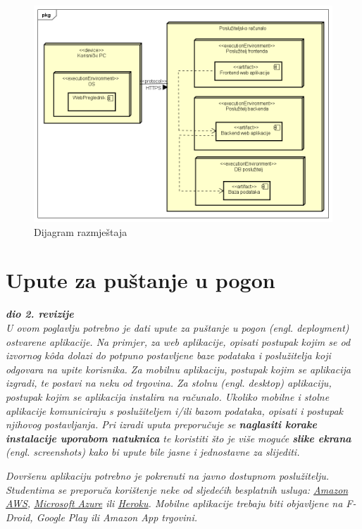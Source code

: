 			 \begin{figure}[H]
			 	\includegraphics[width=\textwidth]{dijagrami/Dijagram razmjestaja.PNG} %
			 	\caption{Dijagram razmještaja}
			 	\label{fig:dijagramrazmjestaja} %
			 \end{figure}
			
			\eject 
		
		\section{Upute za puštanje u pogon}
		
			\textbf{\textit{dio 2. revizije}}\\
		
			 \textit{U ovom poglavlju potrebno je dati upute za puštanje u pogon (engl. deployment) ostvarene aplikacije. Na primjer, za web aplikacije, opisati postupak kojim se od izvornog kôda dolazi do potpuno postavljene baze podataka i poslužitelja koji odgovara na upite korisnika. Za mobilnu aplikaciju, postupak kojim se aplikacija izgradi, te postavi na neku od trgovina. Za stolnu (engl. desktop) aplikaciju, postupak kojim se aplikacija instalira na računalo. Ukoliko mobilne i stolne aplikacije komuniciraju s poslužiteljem i/ili bazom podataka, opisati i postupak njihovog postavljanja. Pri izradi uputa preporučuje se \textbf{naglasiti korake instalacije uporabom natuknica} te koristiti što je više moguće \textbf{slike ekrana} (engl. screenshots) kako bi upute bile jasne i jednostavne za slijediti.}
			
			
			 \textit{Dovršenu aplikaciju potrebno je pokrenuti na javno dostupnom poslužitelju. Studentima se preporuča korištenje neke od sljedećih besplatnih usluga: \href{https://aws.amazon.com/}{Amazon AWS}, \href{https://azure.microsoft.com/en-us/}{Microsoft Azure} ili \href{https://www.heroku.com/}{Heroku}. Mobilne aplikacije trebaju biti objavljene na F-Droid, Google Play ili Amazon App trgovini.}
			
			
			\eject 